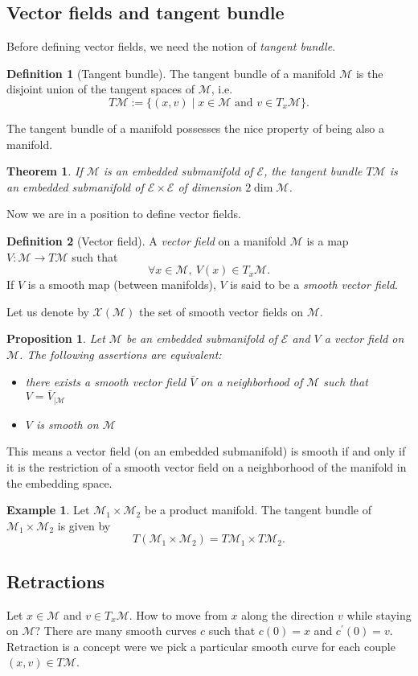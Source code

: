\documentclass[10pt,a4paper]{book}
\theoremstyle{definition}
\newtheorem{defn}{Definition}[section]
\newtheorem{exm}{Example}[section]
\theoremstyle{plain}
\newtheorem{thm}{Theorem}[section]
\newtheorem{prop}{Proposition}[section]
\theoremstyle{remark}
\newcommand{\E}{\mathcal{E}}
\newcommand \M {\mathcal{M}}
\begin{document}
\subsection{Vector fields and tangent bundle}
Before defining vector fields, we need the notion of \emph{tangent bundle}.
\begin{defn}[Tangent bundle]
The tangent bundle of a manifold $\M$ is the disjoint union of the tangent spaces of $\M$, i.e.
$$T\M :=\{(x,v)\mid x \in \M \text{ and } v\in T_x\M\}.$$
\end{defn}
The tangent bundle of a manifold possesses the nice property of being also a manifold.
\begin{thm}
If $\M$ is an embedded submanifold of $\E$, the tangent bundle $T\M$ is an embedded submanifold of $\E \times \E$ of dimension $2\dim \M$.
\end{thm}
Now we are in a position to define vector fields.
\begin{defn}[Vector field]
A \emph{vector field} on a manifold $\M$ is a map $V:\M\to T\M$ such that
$$\forall x \in \M,~V(x)\in T_x\M.$$
If $V$ is a smooth map (between manifolds), $V$ is said to be a \emph{smooth vector field}. 
\end{defn}
Let us denote by $\mathcal{X}(\M)$ the set of smooth vector fields on $\M$.
\begin{prop}
Let $\M$ be an embedded submanifold of $\mathcal{E}$ and $V$ a vector field on $\M$. The following assertions are equivalent:
\begin{itemize}
\item there exists a smooth vector field $\bar{V}$ on a neighborhood of $\M$ such that $V=\bar{V}_{\mid \M}$
\item $V$ is smooth on $\M$
\end{itemize}
\end{prop}
This means a vector field (on an embedded submanifold) is smooth if and only if it is the restriction of a smooth vector field on a neighborhood of the manifold in the embedding space.
\begin{exm}
Let $\M_1\times \M_2$ be a product manifold. The tangent bundle of $\M_1\times \M_2$ is given by
$$T(\M_1\times \M_2)=T\M_1\times T\M_2.$$
\end{exm}


\subsection{Retractions}
Let $x\in \M$ and $v\in T_x\M$. How to move from $x$ along the direction $v$ while staying on $\M$? There are many smooth curves $c$ such that $c(0)=x$ and $c^{\prime}(0)=v$. Retraction is a concept were we pick a particular smooth  curve for each couple $(x,v)\in T\M$.
\end{document}
